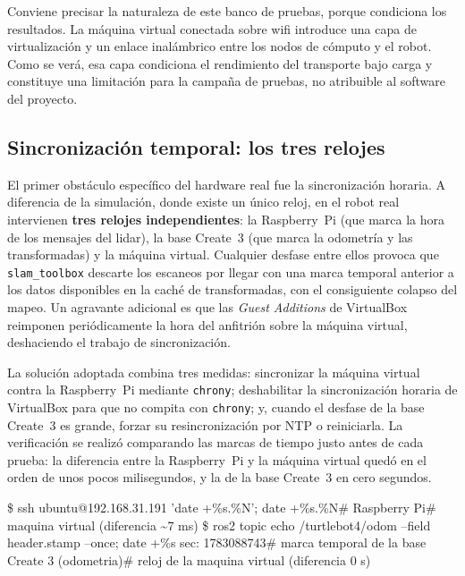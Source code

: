 Conviene precisar la naturaleza de este banco de pruebas, porque condiciona los resultados. La
máquina virtual conectada sobre wifi introduce una capa de virtualización y un enlace
inalámbrico entre los nodos de cómputo y el robot. Como se verá, esa capa condiciona el rendimiento
del transporte bajo carga y constituye una limitación para la campaña de pruebas, no atribuible al
software del proyecto.

\subsection{Sincronización temporal: los tres relojes}
\label{sec:real-relojes}

El primer obstáculo específico del hardware real fue la sincronización horaria. A diferencia de
la simulación, donde existe un único reloj, en el robot real intervienen \textbf{tres relojes
independientes}: la Raspberry~Pi (que marca la hora de los mensajes del \gls{lidar}), la base
Create~3 (que marca la odometría y las transformadas) y la máquina virtual. Cualquier desfase
entre ellos provoca que \texttt{slam\_toolbox} descarte los escaneos por llegar con una marca
temporal anterior a los datos disponibles en la caché de transformadas, con el consiguiente
colapso del mapeo. Un agravante adicional es que las \emph{Guest Additions} de VirtualBox
reimponen periódicamente la hora del anfitrión sobre la máquina virtual, deshaciendo el trabajo
de sincronización.

La solución adoptada combina tres medidas: sincronizar la máquina virtual contra la Raspberry~Pi
mediante \texttt{chrony}; deshabilitar la sincronización horaria de VirtualBox para que no compita
con \texttt{chrony}; y, cuando el desfase de la base Create~3 es grande, forzar su
resincronización por NTP o reiniciarla. La verificación se realizó comparando las marcas de
tiempo justo antes de cada prueba: la diferencia entre la Raspberry~Pi y la máquina virtual quedó
en el orden de unos pocos milisegundos, y la de la base Create~3 en cero segundos.

\begin{terminal}[title={Verificación de la sincronización de los tres relojes}]
\$ ssh ubuntu@192.168.31.191 'date +\%s.\%N'; date +\%s.\%N\quad\# Raspberry Pi\quad\# maquina virtual (diferencia \textasciitilde{}7 ms)\newline
\newline
\$ ros2 topic echo /turtlebot4/odom --field header.stamp --once; date +\%s\newline
sec: 1783088743\quad\# marca temporal de la base Create 3 (odometria)\quad\# reloj de la maquina virtual (diferencia 0 s)
\end{terminal}

